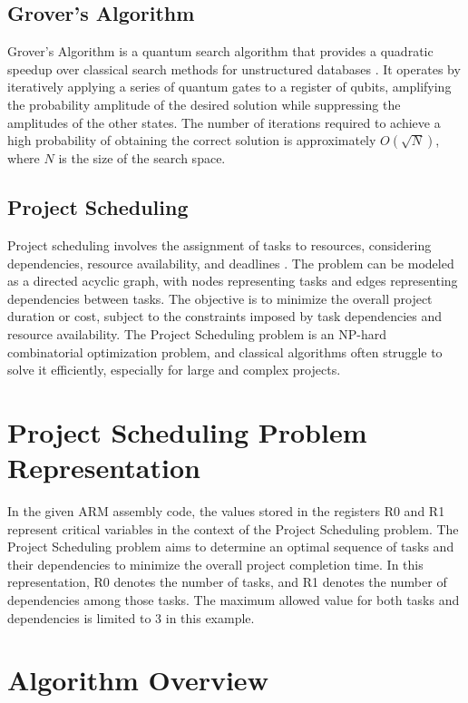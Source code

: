 \subsection{Grover's Algorithm}

Grover's Algorithm is a quantum search algorithm that provides a quadratic speedup over classical search methods for unstructured databases \cite{grover1996fast}. It operates by iteratively applying a series of quantum gates to a register of qubits, amplifying the probability amplitude of the desired solution while suppressing the amplitudes of the other states. The number of iterations required to achieve a high probability of obtaining the correct solution is approximately $O(\sqrt{N})$, where $N$ is the size of the search space.

\subsection{Project Scheduling}

Project scheduling involves the assignment of tasks to resources, considering dependencies, resource availability, and deadlines \cite{blazewicz1993scheduling}. The problem can be modeled as a directed acyclic graph, with nodes representing tasks and edges representing dependencies between tasks. The objective is to minimize the overall project duration or cost, subject to the constraints imposed by task dependencies and resource availability. The Project Scheduling problem is an NP-hard combinatorial optimization problem, and classical algorithms often struggle to solve it efficiently, especially for large and complex projects.



\section{Project Scheduling Problem Representation}

In the given ARM assembly code, the values stored in the registers R0 and R1 represent critical variables in the context of the Project Scheduling problem. The Project Scheduling problem aims to determine an optimal sequence of tasks and their dependencies to minimize the overall project completion time. In this representation, R0 denotes the number of tasks, and R1 denotes the number of dependencies among those tasks. The maximum allowed value for both tasks and dependencies is limited to 3 in this example.

\section{Algorithm Overview}

